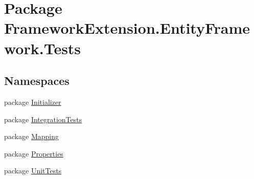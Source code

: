 \hypertarget{namespace_framework_extension_1_1_entity_framework_1_1_tests}{\section{Package Framework\-Extension.\-Entity\-Framework.\-Tests}
\label{namespace_framework_extension_1_1_entity_framework_1_1_tests}
}
\subsection*{Namespaces}
\begin{DoxyCompactItemize}
\item 
package \hyperlink{namespace_framework_extension_1_1_entity_framework_1_1_tests_1_1_initializer}{Initializer}
\item 
package \hyperlink{namespace_framework_extension_1_1_entity_framework_1_1_tests_1_1_integration_tests}{Integration\-Tests}
\item 
package \hyperlink{namespace_framework_extension_1_1_entity_framework_1_1_tests_1_1_mapping}{Mapping}
\item 
package \hyperlink{namespace_framework_extension_1_1_entity_framework_1_1_tests_1_1_properties}{Properties}
\item 
package \hyperlink{namespace_framework_extension_1_1_entity_framework_1_1_tests_1_1_unit_tests}{Unit\-Tests}
\end{DoxyCompactItemize}
